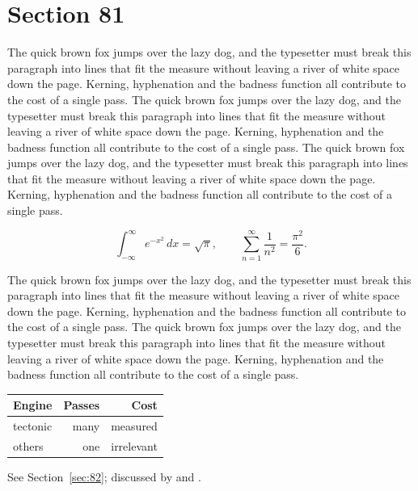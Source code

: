 \documentclass{article}
\begin{document}
\section{Section 81}
\label{sec:81}
The quick brown fox jumps over the lazy dog, and the typesetter must break this paragraph into lines that fit the measure without leaving a river of white space down the page. Kerning, hyphenation and the badness function all contribute to the cost of a single pass. The quick brown fox jumps over the lazy dog, and the typesetter must break this paragraph into lines that fit the measure without leaving a river of white space down the page. Kerning, hyphenation and the badness function all contribute to the cost of a single pass. The quick brown fox jumps over the lazy dog, and the typesetter must break this paragraph into lines that fit the measure without leaving a river of white space down the page. Kerning, hyphenation and the badness function all contribute to the cost of a single pass. 

\begin{equation}\label{eq:81}
\int_{-\infty}^{\infty} e^{-x^{2}}\,dx = \sqrt{\pi}, \qquad
\sum_{n=1}^{\infty} \frac{1}{n^{2}} = \frac{\pi^{2}}{6}.
\end{equation}

The quick brown fox jumps over the lazy dog, and the typesetter must break this paragraph into lines that fit the measure without leaving a river of white space down the page. Kerning, hyphenation and the badness function all contribute to the cost of a single pass. The quick brown fox jumps over the lazy dog, and the typesetter must break this paragraph into lines that fit the measure without leaving a river of white space down the page. Kerning, hyphenation and the badness function all contribute to the cost of a single pass. 

\begin{center}
\begin{tabular}{lrr}
\toprule
Engine & Passes & Cost \\
\midrule
tectonic & many & measured \\
others & one & irrelevant \\
\bottomrule
\end{tabular}
\end{center}

See Section~\ref{sec:82}; discussed by \textcite{k2} and \textcite{l4}.
\end{document}
